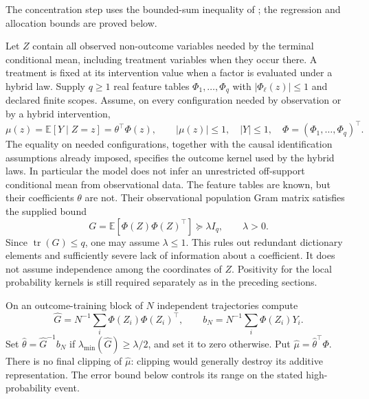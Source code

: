 \documentclass[11pt]{article}
\theoremstyle{definition}
\begin{document}
The concentration step uses the bounded-sum inequality of \cite{hoeffding};
the regression and allocation bounds are proved below.

Let $Z$ contain all observed non-outcome variables needed by the terminal
conditional mean, including treatment variables when they occur there.
A treatment is fixed at its intervention value when a factor is evaluated
under a hybrid law. Supply $q\ge1$ real feature tables
$\Phi_1,\ldots,\Phi_q$ with $|\Phi_\ell(z)|\le1$ and declared
finite scopes. Assume, on every configuration needed by observation or
by a hybrid intervention,
\[
 \mu(z)=\mathbb E[Y\mid Z=z]
       =\theta^\top\Phi(z),\qquad |\mu(z)|\le1,\quad |Y|\le1,
 \quad \Phi=(\Phi_1,\ldots,\Phi_q)^\top.             \tag{11}
\]
The equality on needed configurations, together with the causal
identification assumptions already imposed, specifies the outcome kernel
used by the hybrid laws. In particular the model does not infer an
unrestricted off-support conditional mean from observational data.
The feature tables are known, but their coefficients $\theta$ are not.
Their observational population Gram matrix satisfies the supplied bound
\[
 G=\mathbb E[\Phi(Z)\Phi(Z)^\top]\succeq\lambda I_q,
 \qquad \lambda>0.                                  \tag{12}
\]
Since $\operatorname{tr}(G)\le q$, one may assume $\lambda\le1$.
This rules out redundant dictionary elements and sufficiently severe
lack of information about a coefficient. It does not assume independence
among the coordinates of $Z$. Positivity for the local probability
kernels is still required separately as in the preceding sections.

On an outcome-training block of $N$ independent trajectories compute
\[
 \widehat G=N^{-1}\sum_i\Phi(Z_i)\Phi(Z_i)^\top,
 \qquad b_N=N^{-1}\sum_i\Phi(Z_i)Y_i.
\]
Set $\widehat\theta=\widehat G^{-1}b_N$ if
$\lambda_{\min}(\widehat G)\ge\lambda/2$, and set it to zero
otherwise. Put $\widehat\mu=\widehat\theta^\top\Phi$.
There is no final clipping of $\widehat\mu$: clipping would generally
destroy its additive representation. The error bound below controls its
range on the stated high-probability event.
\end{document}
